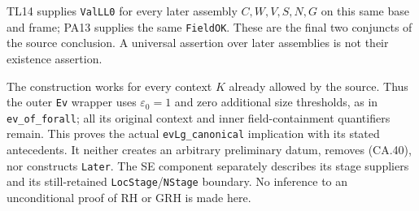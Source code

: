 TL14 supplies \texttt{ValLL0} for every later assembly
$C,W,V,S,N,G$ on this same base and frame; PA13 supplies the
same \texttt{FieldOK}. These are the final two conjuncts of
the source conclusion. A universal assertion over later
assemblies is not their existence assertion.

The construction works for every context $K$ already allowed
by the source. Thus the outer \texttt{Ev} wrapper uses
$\varepsilon_0=1$ and zero additional size thresholds, as in
\texttt{ev\_of\_forall}; all its original context and inner
field-containment quantifiers remain. This proves the actual
\texttt{evLg\_canonical} implication with its stated antecedents.
It neither creates an arbitrary preliminary datum, removes
(CA.40), nor constructs \texttt{Later}. The SE component
separately describes its stage suppliers and its still-retained
\texttt{LocStage}/\texttt{NStage} boundary. No inference to an
unconditional proof of RH or GRH is made here.
